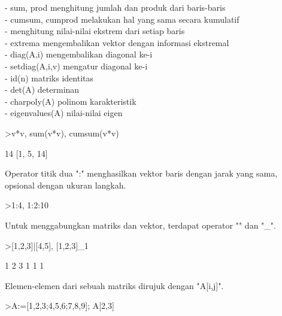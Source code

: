 \documentclass[a4paper,10pt]{article}
\begin{document}
\begin{eulernotebook}
\begin{eulercomment}
\begin{eulercomment}
\begin{eulercomment}
\begin{eulercomment}
\begin{eulercomment}
\begin{eulercomment}
\begin{eulercomment}
- sum, prod menghitung jumlah dan produk dari baris-baris\\
- cumsum, cumprod melakukan hal yang sama secara kumulatif\\
- menghitung nilai-nilai ekstrem dari setiap baris\\
- extrema mengembalikan vektor dengan informasi ekstremal\\
- diag(A,i) mengembalikan diagonal ke-i\\
- setdiag(A,i,v) mengatur diagonal ke-i\\
- id(n) matriks identitas\\
- det(A) determinan\\
- charpoly(A) polinom karakteristik\\
- eigenvalues(A) nilai-nilai eigen
\end{eulercomment}
\begin{eulerprompt}
>v*v, sum(v*v), cumsum(v*v)
\end{eulerprompt}
\begin{euleroutput}
  [1,  4,  9]
  14
  [1,  5,  14]
\end{euleroutput}
\begin{eulercomment}
Operator titik dua ":" menghasilkan vektor baris dengan jarak yang
sama, opsional dengan ukuran langkah.
\end{eulercomment}
\begin{eulerprompt}
>1:4, 1:2:10
\end{eulerprompt}
\begin{euleroutput}
  [1,  2,  3,  4]
  [1,  3,  5,  7,  9]
\end{euleroutput}
\begin{eulercomment}
Untuk menggabungkan matriks dan vektor, terdapat operator "\textbar{}" dan "\_".
\end{eulercomment}
\begin{eulerprompt}
>[1,2,3]|[4,5], [1,2,3]_1
\end{eulerprompt}
\begin{euleroutput}
  [1,  2,  3,  4,  5]
              1             2             3 
              1             1             1 
\end{euleroutput}
\begin{eulercomment}
Elemen-elemen dari sebuah matriks dirujuk dengan "A[i,j]".
\end{eulercomment}
\begin{eulerprompt}
>A:=[1,2,3;4,5,6;7,8,9]; A[2,3]
\end{eulerprompt}
\begin{euleroutput}

\end{euleroutput}
\end{eulercomment}
\end{eulercomment}
\end{eulercomment}
\end{eulercomment}
\end{eulercomment}
\end{eulercomment}
\end{eulernotebook}
\end{document}
